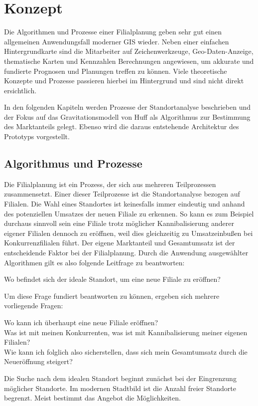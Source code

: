 \chapter{Konzept}
\label{ch:concept}
Die Algorithmen und Prozesse einer Filialplanung geben sehr gut einen allgemeinen Anwendungsfall moderner GIS wieder. 
Neben einer einfachen Hintergrundkarte sind die Mitarbeiter auf Zeichenwerkzeuge, Geo-Daten-Anzeige, thematische Karten und Kennzahlen Berechnungen angewiesen, um akkurate und fundierte Prognosen und Planungen treffen zu können.
Viele theoretische Konzepte und Prozesse passieren hierbei im Hintergrund und sind nicht direkt ersichtlich.

In den folgenden Kapiteln werden Prozesse der Standortanalyse beschrieben und der Fokus auf das Gravitationsmodell von Huff als Algorithmus zur Bestimmung des Marktanteils gelegt.
Ebenso wird die daraus entstehende Architektur des Prototyps vorgestellt.

\section{Algorithmus und Prozesse}
Die Filialplanung ist ein Prozess, der sich aus mehreren Teilprozessen zusammensetzt. 
Einer dieser Teilprozesse ist die Standortanalyse bezogen auf Filialen.
Die Wahl eines Standortes ist keinesfalls immer eindeutig und anhand des potenziellen Umsatzes der neuen Filiale zu erkennen.
So kann es zum Beispiel durchaus sinnvoll sein eine Filiale trotz möglicher Kannibalisierung anderer eigener Filialen dennoch zu eröffnen, weil dies gleichzeitig zu Umsatzeinbußen bei Konkurrenzfilialen führt. 
Der eigene Marktanteil und Gesamtumsatz ist der entscheidende Faktor bei der Filialplanung.
Durch die Anwendung ausgewählter Algorithmen gilt es also folgende Leitfrage zu beantworten:

Wo befindet sich der ideale Standort, um eine neue Filiale zu eröffnen?

Um diese Frage fundiert beantworten zu können, ergeben sich mehrere vorliegende Fragen:

Wo kann ich überhaupt eine neue Filiale eröffnen?\\
Was ist mit meinen Konkurrenten, was ist mit Kannibalisierung meiner eigenen Filialen?\\
Wie kann ich folglich also sicherstellen, dass sich mein Gesamtumsatz durch die Neueröffnung steigert?

Die Suche nach dem idealen Standort beginnt zunächst bei der Eingrenzung möglicher Standorte.
Im modernen Stadtbild ist die Anzahl freier Standorte begrenzt.
Meist bestimmt das Angebot die Möglichkeiten.

